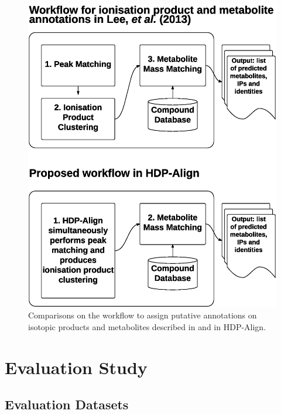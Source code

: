 \begin{figure}
\centering\includegraphics[width=0.7\columnwidth]{05-hdp/figures/figure_3.eps}
\centering\caption{Comparisons on the workflow to assign putative annotations on isotopic products and metabolites described in \cite{Lee2013} and in HDP-Align.\label{fig-workflow}}
\end{figure}

\section{Evaluation Study}

\subsection{Evaluation Datasets}
\label{sub:Evaluation-datasets}

